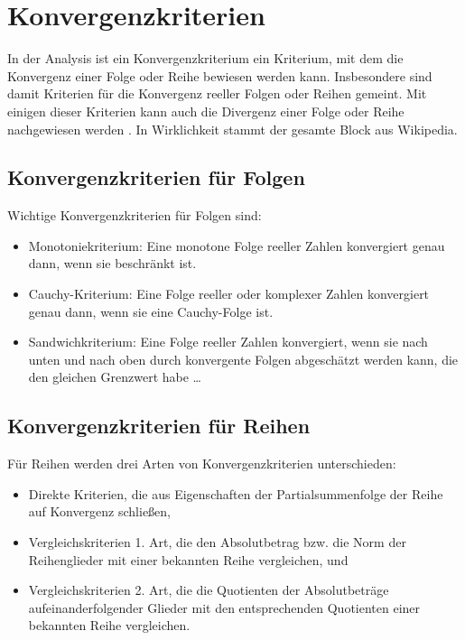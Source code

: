 
\chapter{Konvergenzkriterien}
\label{chapter-convergence}

In der Analysis ist ein Konvergenzkriterium ein Kriterium, mit dem die Konvergenz einer Folge oder Reihe bewiesen werden kann. Insbesondere sind damit Kriterien für die Konvergenz reeller Folgen oder Reihen gemeint. Mit einigen dieser Kriterien kann auch die Divergenz einer Folge oder Reihe nachgewiesen werden \cite{confcit}.
In Wirklichkeit stammt der gesamte Block aus Wikipedia.

\section{Konvergenzkriterien für Folgen}

Wichtige Konvergenzkriterien für Folgen sind:
\begin{itemize}  
\item Monotoniekriterium: Eine monotone Folge reeller Zahlen konvergiert genau dann, wenn sie beschränkt ist. 
\item Cauchy-Kriterium: Eine Folge reeller oder komplexer Zahlen konvergiert genau dann, wenn sie eine Cauchy-Folge ist.
\item  Sandwichkriterium: Eine Folge reeller Zahlen konvergiert, wenn sie nach unten und nach oben durch konvergente Folgen abgeschätzt werden kann, die den gleichen Grenzwert habe \ldots
\cite{barro1992convergence}
\end{itemize}

\section{Konvergenzkriterien für Reihen}

Für Reihen werden drei Arten von Konvergenzkriterien unterschieden:
\begin{itemize}
\item Direkte Kriterien, die aus Eigenschaften der Partialsummenfolge der Reihe auf Konvergenz schließen,
\item Vergleichskriterien 1. Art, die den Absolutbetrag bzw. die Norm der Reihenglieder mit einer bekannten Reihe vergleichen, und
\item Vergleichskriterien 2. Art, die die Quotienten der Absolutbeträge aufeinanderfolgender Glieder mit den entsprechenden Quotienten einer bekannten Reihe vergleichen.
\end{itemize}

